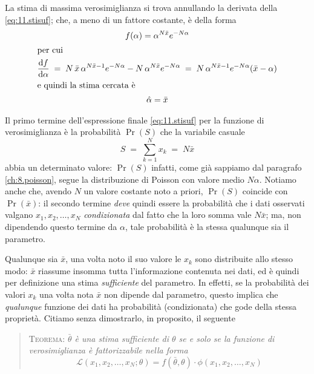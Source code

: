 La stima di massima verosimiglianza si trova annullando la
derivata della \eqref{eq:11.stisuf}; che, a meno di un
fattore costante, \`e della forma
\begin{gather*}
  f(\alpha) = \alpha^{N \bar x} e^{- N \alpha} \\
  \intertext{per cui}
  \frac{\mathrm{d} f}{\mathrm{d} \alpha} \; = \; N \, \bar x \,
  \alpha^{N \bar x - 1} e^{- N \alpha} - N \, \alpha^{N \bar
    x} e^{- N \alpha} \; = \; N \, \alpha^{N \bar x - 1}
  e^{- N \alpha} (\bar x - \alpha) \\
  \intertext{e quindi la stima cercata \`e}
  \hat \alpha = \bar x
\end{gather*}

Il primo termine dell'espressione finale
\eqref{eq:11.stisuf} per la funzione di verosimiglianza \`e
la probabilit\`a $\Pr(S)$ che la variabile casuale
\begin{equation*}
  S \; = \; \sum_{k=1}^N x_k \; = \; N \bar x
\end{equation*}
abbia un determinato valore: $\Pr(S)$ infatti, come gi\`a
sappiamo dal paragrafo \ref{ch:8.poisson}, segue la
distribuzione di Poisson con valore medio $N \alpha$.
Notiamo anche che, avendo $N$ un valore costante noto a
priori, $\Pr(S)$ coincide con $\Pr(\bar x)$: il secondo
termine \emph{deve} quindi essere la probabilit\`a che i
dati osservati valgano $x_1, x_2, \ldots, x_N$
\emph{condizionata} dal fatto che la loro somma vale $N \bar
x$; ma, non dipendendo questo termine da $\alpha$, tale
probabilit\`a \`e la stessa qualunque sia il parametro.

Qualunque sia $\bar x$, una volta noto il suo valore le
$x_k$ sono distribuite allo stesso modo: $\bar x$ riassume
insomma tutta l'informazione contenuta nei dati, ed \`e
quindi per definizione una stima \emph{sufficiente} del
parametro.  In effetti, se la probabilit\`a dei valori $x_k$
una volta nota $\bar x$ non dipende dal parametro, questo
implica che \emph{qualunque} funzione dei dati ha
probabilit\`a (condizionata) che gode della stessa
propriet\`a.  Citiamo senza dimostrarlo, in proposito, il
seguente
\begin{quote}
  \textsc{Teorema:} \textsl{$\bar \theta$ \`e una stima
    sufficiente di $\theta$ se e solo se la funzione di
    verosimiglianza \`e fattorizzabile nella forma}
  \begin{equation*}
    \mathcal{L} (x_1, x_2, \ldots, x_N; \theta) = f(\bar
    \theta, \theta) \cdot \phi(x_1, x_2, \ldots, x_N)
  \end{equation*}
\end{quote}%

